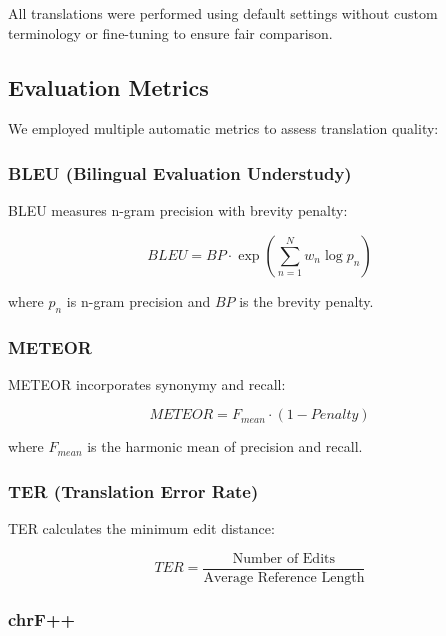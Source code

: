 All translations were performed using default settings without custom terminology or fine-tuning to ensure fair comparison.

\subsection{Evaluation Metrics}

We employed multiple automatic metrics to assess translation quality:

\subsubsection{BLEU (Bilingual Evaluation Understudy)}

BLEU \cite{papineni2002bleu} measures n-gram precision with brevity penalty:

\begin{equation}
BLEU = BP \cdot \exp\left(\sum_{n=1}^{N} w_n \log p_n\right)
\end{equation}

where $p_n$ is n-gram precision and $BP$ is the brevity penalty.

\subsubsection{METEOR}

METEOR \cite{banerjee2005meteor} incorporates synonymy and recall:

\begin{equation}
METEOR = F_{mean} \cdot (1 - Penalty)
\end{equation}

where $F_{mean}$ is the harmonic mean of precision and recall.

\subsubsection{TER (Translation Error Rate)}

TER \cite{snover2006study} calculates the minimum edit distance:

\begin{equation}
TER = \frac{\text{Number of Edits}}{\text{Average Reference Length}}
\end{equation}

\subsubsection{chrF++}

